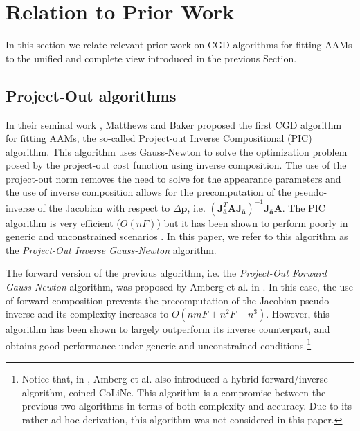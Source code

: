 \section{Relation to Prior Work}
\label{sec:relaltion}

In this section we relate relevant prior work on CGD algorithms for fitting AAMs \cite{Matthews2004, Gross2005, Papandreou2008, Amberg2009, Martins2010, Tzimiropoulos2013, Kossaifi2014} to the unified and complete view introduced in the previous Section.

\subsection{Project-Out algorithms}

In their seminal work \cite{Matthews2004}, Matthews and Baker proposed the first CGD algorithm for fitting AAMs, the so-called Project-out Inverse Compositional (PIC) algorithm. This algorithm uses Gauss-Newton to solve the optimization problem posed by the project-out cost function using inverse composition. The use of the project-out norm removes the need to solve for the appearance parameters and the use of inverse composition allows for the precomputation of the pseudo-inverse of the Jacobian with respect to $\Delta\mathbf{p}$, i.e. $\left( \mathbf{J}_{\bar{\mathbf{a}}}^T\bar{\mathbf{A}}\mathbf{J}_{\bar{\mathbf{a}}} \right)^{-1}\mathbf{J}_{\bar{\mathbf{a}}}\bar{\mathbf{A}}$. The PIC algorithm is very efficient ($O(nF)$) but it has been shown to perform poorly in generic and unconstrained scenarios \cite{Gross2005, Papandreou2008}. In this paper, we refer to this algorithm as the \emph{Project-Out Inverse Gauss-Newton} algorithm.

The forward version of the previous algorithm, i.e. the \emph{Project-Out Forward Gauss-Newton} algorithm, was proposed by Amberg et al. in \cite{Amberg2009}. In this case, the use of forward composition prevents the precomputation of the Jacobian pseudo-inverse and its complexity increases to $O(nmF + n^2F + n^3)$. However, this algorithm has been shown to largely outperform its inverse counterpart, and obtains good performance under generic and unconstrained conditions \cite{Amberg2009, Tzimiropoulos2013}\footnote{Notice that, in \cite{Amberg2009}, Amberg et al. also introduced a hybrid forward/inverse algorithm, coined CoLiNe. This algorithm is a compromise between the previous two algorithms in terms of both complexity and accuracy. Due to its rather ad-hoc derivation, this algorithm was not considered in this paper.}

